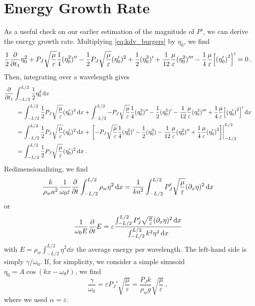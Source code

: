 \documentclass{jfm}
\renewcommand*{\epsilon}{\varepsilon}
\begin{document}
\appendix

\section{Energy Growth Rate \label{sec:energy_growth_rate}}
As a useful check on our earlier estimation of the magnitude of $P'$, we
can derive the energy growth rate.
Multiplying \cref{eq:kdv_burgers} by $\eta_0$, we find
\begin{equation}
  \frac{1}{2} \pdv{t_1} \eta_0^2 + P_J \sqrt{\frac{\mu}{\epsilon}}
  \frac{1}{4} (\eta_0^2)'' - \frac{1}{2} P_J \sqrt{\frac{\mu}{\epsilon}}
  (\eta_0')^2 + \frac{1}{2} (\eta_0^3)' + \frac{1}{12}
  \frac{\mu}{\epsilon} (\eta_0^2)''' - \frac{1}{4} \frac{\mu}{\epsilon}
  \bqty{\pqty{\eta_0'}^2}' = 0 \,.
\end{equation}
Then, integrating over a wavelength gives
\begin{equation}
  \begin{split}
  &\pdv{t_1} \int_{-L/2}^{L/2} \frac{1}{2} \eta_0^2 \dd{x} \\
  &\qquad= \int_{-L/2}^{L/2} \frac{1}{2} P_J \sqrt{\frac{\mu}{\epsilon}}
    (\eta_0')^2 \dd{x} + \int_{-L/2}^{L/2} -P_J
    \sqrt{\frac{\mu}{\epsilon}} \frac{1}{4} (\eta_0^2)'' - \frac{1}{2}
    (\eta_0^3)' - \frac{1}{12} \frac{\mu}{\epsilon} (\eta_0^2)''' +
    \frac{1}{4} \frac{\mu}{\epsilon} \bqty{\pqty{\eta_0'}^2}' \dd{x}
  \\
  &\qquad=
  \int_{-L/2}^{L/2} \frac{1}{2} P_J \sqrt{\frac{\mu}{\epsilon}}
  (\eta_0')^2 \dd{x} + \eval{\bqty{-P_J \sqrt{\frac{\mu}{\epsilon}}
      \frac{1}{4} (\eta_0^2)'  - \frac{1}{2} (\eta_0^3) - \frac{1}{12}
      \frac{\mu}{\epsilon} (\eta_0^2)'' + \frac{1}{4}
      \frac{\mu}{\epsilon} \pqty{\eta_0'}^2}}_{-L/2}^{L/2}
  \\
  &\qquad=
  \int_{-L/2}^{L/2} \frac{1}{2} P_J \sqrt{\frac{\mu}{\epsilon}}
  (\eta_0')^2 \dd{x} \,.
  \end{split}
\end{equation}
Redimensionalizing, we find
\begin{equation}
  \frac{k}{\rho_w a^2} \frac{1}{\omega_0 \epsilon} \pdv{t} \int_{-L/2}^{L/2}
  \rho_w \eta^2 \dd{x} = \frac{1}{k a^2} \int_{-L/2}^{L/2} P_J'
  \sqrt{\frac{\mu}{\epsilon}} (\partial_x \eta)^2 \dd{x}
\end{equation}
or
\begin{equation}
  \frac{1}{\omega_0 E} \pdv{t} E =
  \epsilon
  \frac{
    \int_{-L/2}^{L/2} P_J' \sqrt{\frac{\mu}{\epsilon}} (\partial_x
    \eta)^2 \dd{x}
  }
  {
    \int_{-L/2}^{L/2} k^2 \eta^2 \dd{x}
  }
\end{equation}
with $E = \rho_w \int_{-L/2}^{L/2} \eta^2 \dd{x}$ the average
energy per wavelength.
The left-hand side is simply $\gamma/\omega_0$.
If, for simplicity, we consider a simple sinusoid $\eta_0 = A \cos(k x -
\omega_0 t)$, we find
\begin{equation}
  \frac{\gamma}{\omega_0} = \epsilon P_J' \sqrt{\frac{\mu}{\epsilon}} =
  \frac{P_J k}{\rho_w g} \sqrt{\frac{\mu}{\epsilon}} \,,
\end{equation}
where we used $\alpha = \epsilon$.



\end{document}
